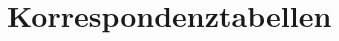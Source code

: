 \documentclass[10pt,a4paper]{article}
\begin{document}
\section{Korrespondenztabellen}
%
%
%
%
%
%
%          

\end{document}
